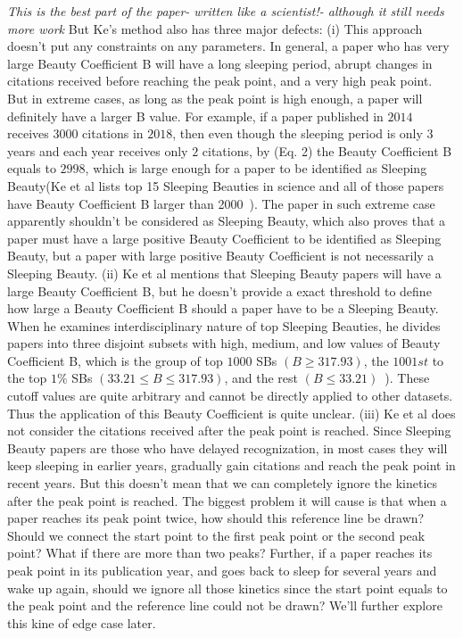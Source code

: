 \documentclass[utf8]{frontiersSCNS}
\begin{document}
\emph{This is the best part of the paper- written like a scientist!- although it still needs more work}
But Ke's method also has three major defects: (i) This approach doesn't put any constraints on any parameters. In general, a paper who has very large Beauty Coefficient B will have a long sleeping period, abrupt changes in citations received before reaching the peak point, and a very high peak point. But in extreme cases, as long as the peak point is high enough, a paper will definitely have a larger B value. For example, if a paper published in $2014$ receives $3000$ citations in $2018$, then even though the sleeping period is only $3$ years and each year receives only $2$ citations, by (Eq. 2) the Beauty Coefficient B equals to $2998$, which is large enough for a paper to be identified as Sleeping Beauty(Ke et al lists top 15 Sleeping Beauties in science and all of those papers have Beauty Coefficient B larger than 2000~\citep{Ke2015}). The paper in such extreme case apparently shouldn't be considered as Sleeping Beauty, which also proves that a paper must have a large positive Beauty Coefficient to be identified as Sleeping Beauty, but a paper with large positive Beauty Coefficient is not necessarily a Sleeping Beauty. (ii) Ke et al mentions that Sleeping Beauty papers will have a large Beauty Coefficient B, but he doesn't provide a exact threshold to define how large a Beauty Coefficient B should a paper have to be a Sleeping Beauty. When he examines interdisciplinary nature of top Sleeping Beauties, he divides papers into three disjoint subsets with high, medium, and low values of Beauty Coefficient B, which is the group of top $1000$ SBs $(B \geq 317.93)$, the $1001st$ to the top $1\%$ SBs $(33.21 \leq B \leq 317.93)$, and the rest $(B \leq 33.21)$~\citep{Ke2015}). These cutoff values are quite arbitrary and cannot be directly applied to other datasets. Thus the application of this Beauty Coefficient is quite unclear. (iii) Ke et al does not consider the citations received after the peak point is reached. Since Sleeping Beauty papers are those who have delayed recognization, in most cases they will keep sleeping in earlier years, gradually gain citations and reach the peak point in recent years. But this doesn't mean that we can completely ignore the kinetics after the peak point is reached. The biggest problem it will cause is that when a paper reaches its peak point twice, how should this reference line be drawn? Should we connect the start point to the first peak point or the second peak point? What if there are more than two peaks? Further, if a paper reaches its peak point in its publication year, and goes back to sleep for several years and wake up again, should we ignore all those kinetics since the start point equals to the peak point and the reference line could not be drawn? We'll further explore this kine of edge case later. 
\end{document}
